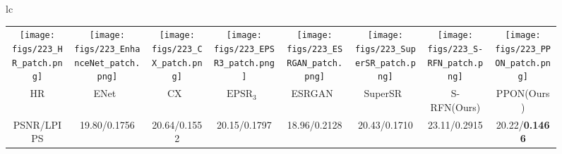 \documentclass[preprint]{elsarticle}
\begin{document}
\begin{figure*}[htpb]
{\begin{tabular}{lc}
\begin{adjustbox}{valign=t}
\begin{tabular}{cccccccc}
					\texttt{[image: figs/223\_HR\_patch.png]} &
					\hspace{-3mm}
					\texttt{[image: figs/223\_EnhanceNet\_patch.png]} &
					\hspace{-3mm}
					\texttt{[image: figs/223\_CX\_patch.png]} &
					\hspace{-3mm}
					\texttt{[image: figs/223\_EPSR3\_patch.png]} &
					\hspace{-3mm}
					\texttt{[image: figs/223\_ESRGAN\_patch.png]} &
					\hspace{-3mm}
					\texttt{[image: figs/223\_SuperSR\_patch.png]} &
					\hspace{-3mm}
					\texttt{[image: figs/223\_S-RFN\_patch.png]} &
					\hspace{-3mm}
					\texttt{[image: figs/223\_PPON\_patch.png]} \\
					HR & \hspace{-3mm} ENet~\cite{EnhanceNet} & \hspace{-3mm} CX~\cite{CX} & \hspace{-3mm} $\text{EPSR}_3$~\cite{EPSR} & \hspace{-3mm} ESRGAN~\cite{ESRGAN} & \hspace{-3mm} SuperSR~\cite{ESRGAN} & \hspace{-3mm} S-RFN(Ours) & \hspace{-3mm} PPON(Ours) \\
					PSNR/LPIPS & \hspace{-3mm} 19.80/0.1756 & \hspace{-3mm} 20.64/0.1552 & \hspace{-3mm} 20.15/0.1797 & \hspace{-3mm} 18.96/0.2128 & \hspace{-3mm} 20.43/0.1710 & \hspace{-3mm} 23.11/0.2915 & \hspace{-3mm} 20.22/\textbf{0.1466} \\
				\end{tabular}
			\end{adjustbox}
			\\
			\begin{adjustbox}{valign=t}
				\scriptsize

\end{adjustbox}
\end{tabular}}
\end{figure*}
\end{document}
